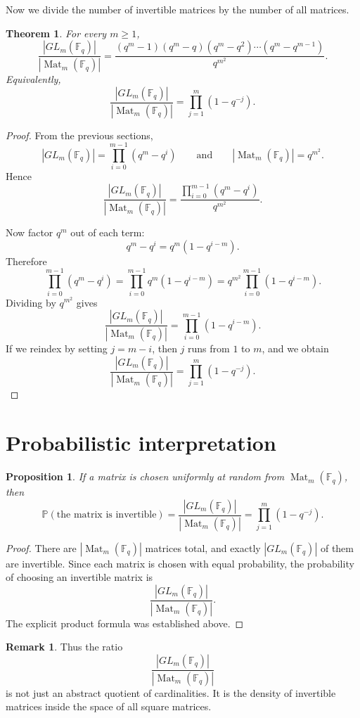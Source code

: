 \documentclass[11pt]{article}
\newcommand{\F}{\mathbb{F}}
\newcommand{\Mat}{\operatorname{Mat}}
\newcommand{\Prob}{\mathbb{P}}
\theoremstyle{definition}
\newtheorem{remark}[definition]{Remark}
\theoremstyle{plain}
\newtheorem{proposition}[definition]{Proposition}
\newtheorem{theorem}[definition]{Theorem}
\begin{document}
	Now we divide the number of invertible matrices by the number of all matrices.
	
	\begin{theorem}
		For every \(m\ge 1\),
		\[
		\frac{|GL_m(\F_q)|}{|\Mat_m(\F_q)|}
		=
		\frac{(q^m-1)(q^m-q)(q^m-q^2)\cdots(q^m-q^{m-1})}{q^{m^2}}.
		\]
		Equivalently,
		\[
		\frac{|GL_m(\F_q)|}{|\Mat_m(\F_q)|}
		=
		\prod_{j=1}^{m}(1-q^{-j}).
		\]
	\end{theorem}
	
	\begin{proof}
		From the previous sections,
		\[
		|GL_m(\F_q)|=\prod_{i=0}^{m-1}(q^m-q^i)
		\qquad\text{and}\qquad
		|\Mat_m(\F_q)|=q^{m^2}.
		\]
		Hence
		\[
		\frac{|GL_m(\F_q)|}{|\Mat_m(\F_q)|}
		=
		\frac{\prod_{i=0}^{m-1}(q^m-q^i)}{q^{m^2}}.
		\]
		
		Now factor \(q^m\) out of each term:
		\[
		q^m-q^i=q^m(1-q^{i-m}).
		\]
		Therefore
		\[
		\prod_{i=0}^{m-1}(q^m-q^i)
		=
		\prod_{i=0}^{m-1} q^m(1-q^{i-m})
		=
		q^{m^2}\prod_{i=0}^{m-1}(1-q^{i-m}).
		\]
		Dividing by \(q^{m^2}\) gives
		\[
		\frac{|GL_m(\F_q)|}{|\Mat_m(\F_q)|}
		=
		\prod_{i=0}^{m-1}(1-q^{i-m}).
		\]
		If we reindex by setting \(j=m-i\), then \(j\) runs from \(1\) to \(m\), and we obtain
		\[
		\frac{|GL_m(\F_q)|}{|\Mat_m(\F_q)|}
		=
		\prod_{j=1}^{m}(1-q^{-j}).
		\]
	\end{proof}
	
	\section{Probabilistic interpretation}
	
	\begin{proposition}
		If a matrix is chosen uniformly at random from \(\Mat_m(\F_q)\), then
		\[
		\Prob(\text{the matrix is invertible})
		=
		\frac{|GL_m(\F_q)|}{|\Mat_m(\F_q)|}
		=
		\prod_{j=1}^{m}(1-q^{-j}).
		\]
	\end{proposition}
	
	\begin{proof}
		There are \(|\Mat_m(\F_q)|\) matrices total, and exactly \(|GL_m(\F_q)|\) of them are invertible. Since each matrix is chosen with equal probability, the probability of choosing an invertible matrix is
		\[
		\frac{|GL_m(\F_q)|}{|\Mat_m(\F_q)|}.
		\]
		The explicit product formula was established above.
	\end{proof}
	
	\begin{remark}
		Thus the ratio
		\[
		\frac{|GL_m(\F_q)|}{|\Mat_m(\F_q)|}
		\]
		is not just an abstract quotient of cardinalities. It is the density of invertible matrices inside the space of all square matrices.
	\end{remark}
	
\end{document}

